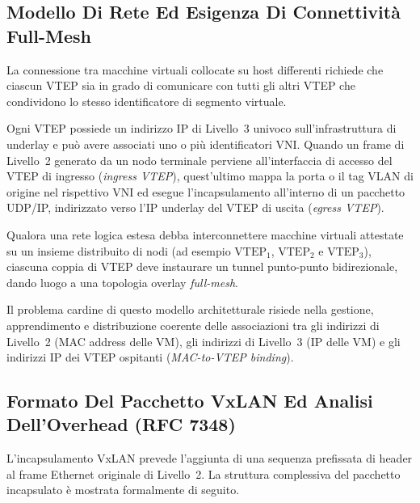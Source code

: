 \documentclass[11pt, a4paper]{article}
\begin{document}
\subsection{Modello Di Rete Ed Esigenza Di Connettività Full-Mesh}

La connessione tra macchine virtuali collocate su host differenti richiede che ciascun VTEP sia in grado di comunicare con tutti gli altri VTEP che condividono lo stesso identificatore di segmento virtuale.


Ogni VTEP possiede un indirizzo IP di Livello~3 univoco sull'infrastruttura di underlay e può avere associati uno o più identificatori VNI. Quando un frame di Livello~2 generato da un nodo terminale perviene all'interfaccia di accesso del VTEP di ingresso (\emph{ingress VTEP}), quest'ultimo mappa la porta o il tag VLAN di origine nel rispettivo VNI ed esegue l'incapsulamento all'interno di un pacchetto UDP/IP, indirizzato verso l'IP underlay del VTEP di uscita (\emph{egress VTEP}).

Qualora una rete logica estesa debba interconnettere macchine virtuali attestate su un insieme distribuito di nodi (ad esempio $\text{VTEP}_1$, $\text{VTEP}_2$ e $\text{VTEP}_3$), ciascuna coppia di VTEP deve instaurare un tunnel punto-punto bidirezionale, dando luogo a una topologia overlay \emph{full-mesh}.


Il problema cardine di questo modello architetturale risiede nella gestione, apprendimento e distribuzione coerente delle associazioni tra gli indirizzi di Livello~2 (MAC address delle VM), gli indirizzi di Livello~3 (IP delle VM) e gli indirizzi IP dei VTEP ospitanti (\emph{MAC-to-VTEP binding}).

\subsection{Formato Del Pacchetto VxLAN Ed Analisi Dell'Overhead (RFC 7348)}

L'incapsulamento VxLAN prevede l'aggiunta di una sequenza prefissata di header al frame Ethernet originale di Livello~2. La struttura complessiva del pacchetto incapsulato è mostrata formalmente di seguito.
\end{document}
